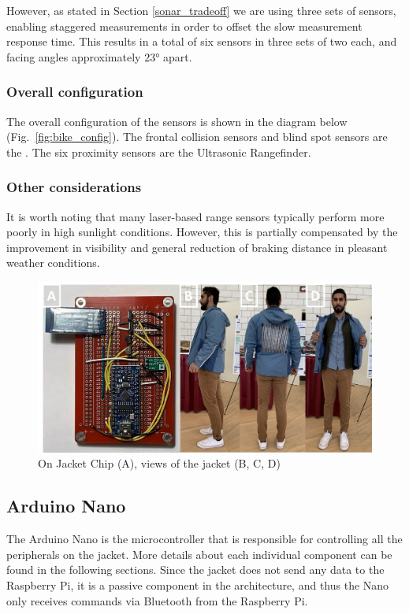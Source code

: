 \documentclass[journal]{IEEEtran}
\begin{document}
However, as stated in Section \ref{sonar_tradeoff} we are using three sets of sensors, enabling staggered measurements in order to offset the slow measurement response time. This results in a total of six sensors in three sets of two each, and facing angles approximately $\ang{23}$ apart.

\subsubsection{Overall configuration}
The overall configuration of the sensors is shown in the diagram below (Fig.~\ref{fig:bike_config}). The frontal collision sensors and blind spot sensors are the \lidar{}. The six proximity sensors are the \sonar{} Ultrasonic Rangefinder.

\subsubsection{Other considerations}
It is worth noting that many laser-based range sensors typically perform more poorly in high sunlight conditions. However, this is partially compensated by the improvement in visibility and general reduction of braking distance in pleasant weather conditions.

\begin{figure}
    \centering
    \includegraphics[width=\columnwidth]{images/jacket_chip.png}
    \caption{On Jacket Chip (A), views of the jacket (B, C, D)}
    \label{fig:jacket_chip}
\end{figure}

\subsection{Arduino Nano}
The Arduino Nano is the microcontroller that is responsible for controlling all the peripherals on the jacket. More details about each individual component can be found in the following sections. Since the jacket does not send any data to the Raspberry Pi, it is a passive component in the architecture, and thus the Nano only receives commands via Bluetooth from the Raspberry Pi. 
\end{document}
